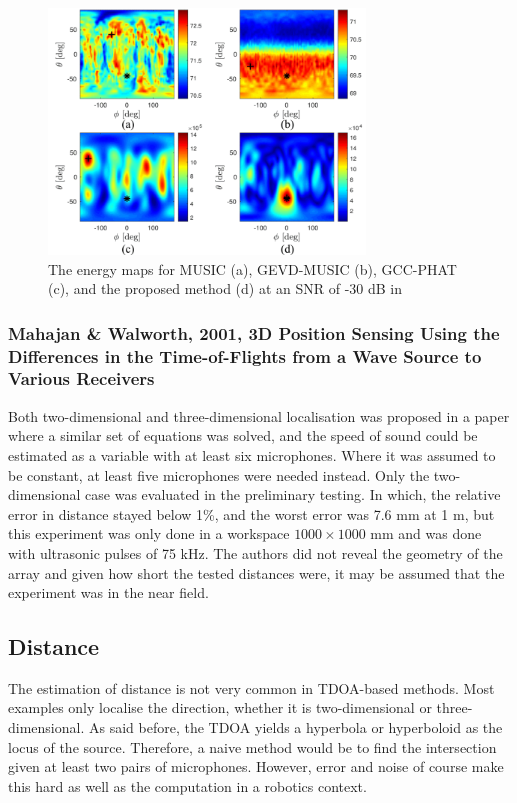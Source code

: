 \documentclass{report}
\begin{document}
\begin{figure}[H]
\includegraphics[width=0.75\textwidth]{./manamperi_2022/map_n30.png}
\centering
\caption{The energy maps for MUSIC (a), GEVD-MUSIC (b), GCC-PHAT (c), and the proposed method (d) at an SNR of -30 \si{dB} in \cite{manamperi_drone_2022}}
\label{fig:manamperi_2022_map_n30}
\centering
\end{figure}

\subsubsection{Mahajan \& Walworth, 2001, 3D Position Sensing Using the Differences in the Time-of-Flights from a Wave Source to Various Receivers}

Both two-dimensional and three-dimensional localisation was proposed in a paper \cite{mahajan_3d_2001} where a similar set of equations was solved, and the speed of sound could be estimated as a variable with at least six microphones. Where it was assumed to be constant, at least five microphones were needed instead. Only the two-dimensional case was evaluated in the preliminary testing. In which, the relative error in distance stayed below 1\%, and the worst error was 7.6 \si{mm} at 1 \si{m}, but this experiment was only done in a workspace $1000\times 1000$ \si{mm} and was done with ultrasonic pulses of 75 \si{kHz}. The authors did not reveal the geometry of the array and given how short the tested distances were, it may be assumed that the experiment was in the near field.

\subsection{Distance}

The estimation of distance is not very common in TDOA-based methods. Most examples only localise the direction, whether it is two-dimensional or three-dimensional. As said before, the TDOA yields a hyperbola or hyperboloid as the locus of the source. Therefore, a naive method would be to find the intersection given at least two pairs of microphones. However, error and noise of course make this hard as well as the computation in a robotics context.
\end{document}
